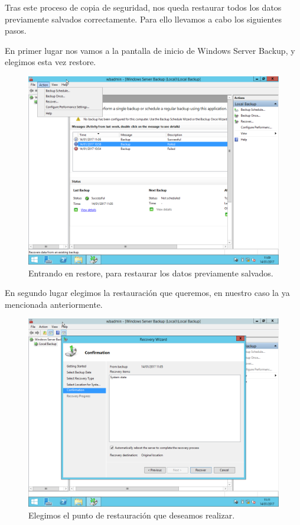 Tras este proceso de copia de seguridad, nos queda restaurar todos los datos previamente salvados correctamente. Para ello llevamos a cabo los siguientes pasos.

En primer lugar nos vamos a la pantalla de inicio de Windows Server Backup, y elegimos esta vez restore.
\begin{figure}[H]
	\begin{center}
		\includegraphics[width=15cm]{Imagenes/Seleccion_restore}
		\caption{Entrando en restore, para restaurar los datos previamente salvados.}
		\label{fig:16}
	\end{center}
\end{figure}
\newpage
En segundo lugar elegimos la restauración que queremos, en nuestro caso la ya mencionada anteriormente.
\begin{figure}[H]
	\begin{center}
		\includegraphics[width=15cm]{Imagenes/Indicando_punto_restauracion}
		\caption{Elegimos el punto de restauración que deseamos realizar.}
		\label{fig:17}
	\end{center}
\end{figure}

